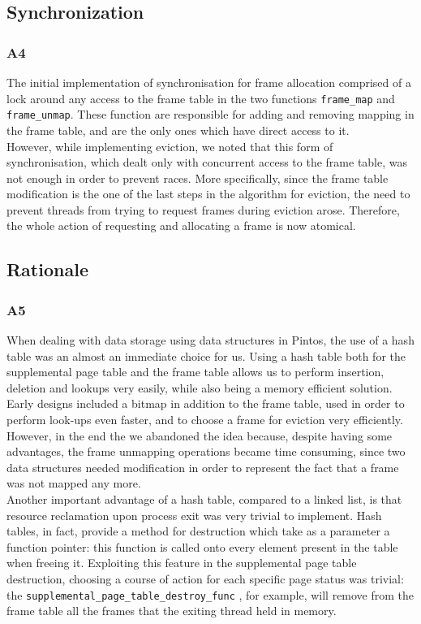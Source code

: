 \documentclass[a4wide, 11pt]{article}
\newcommand{\tx}{\texttt}
\begin{document}
\subsection{Synchronization}
\subsubsection{A4}
The initial implementation of synchronisation for frame allocation comprised of a lock around any access to the frame table in the two functions \tx{frame\_map} and \tx{frame\_unmap}. These function are responsible for adding and removing mapping in the frame table, and are the only ones which have direct access to it. \\
However, while implementing eviction, we noted that this form of synchronisation, which dealt only with concurrent access to the frame table, was not enough in order to prevent races. More specifically, since the frame table modification is the one of the last steps in the algorithm for eviction, the need to prevent threads from trying to request frames during eviction arose. Therefore, the whole action of requesting and allocating a frame is now atomical.
\subsection{Rationale}
\subsubsection{A5}
When dealing with data storage using data structures in Pintos, the use of a hash table was an almost an immediate choice for us. Using a hash table both for the supplemental page table and the frame table allows us to perform insertion, deletion and lookups very easily, while also being a memory efficient solution. Early designs included a bitmap in addition to the frame table, used in order to perform look-ups even faster, and to choose a frame for eviction very efficiently. However, in the end the we abandoned the idea because, despite having some advantages, the frame unmapping operations became time consuming, since two data structures needed modification in order to represent the fact that a frame was not mapped any more. \\
Another important advantage of a hash table, compared to a linked  list, is that resource reclamation upon process exit was very trivial to implement. Hash tables, in fact, provide a method for destruction which take as a parameter a function pointer: this function is called onto every  element present in the table when freeing it. Exploiting this feature in the supplemental page table destruction, choosing a course of action for each specific page status was trivial: the \tx{supplemental\_page\_table\_destroy\_func} , for example, will remove from the frame table all the frames that the exiting thread held in memory.
\end{document}
